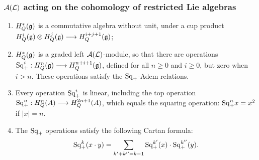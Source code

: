 \documentclass[10pt]{article}
\newcommand{\SqShift}{\Sq_{\smash{+}}}
\newcommand{\Sq}{\mathrm{Sq}}
\newcommand{\LieSteen}{\calA(\calL)}
\begin{document}
\begin{SteenrodAlgebrasAndTheirKoszulDuals}
\subsubsection{$\LieSteen$ acting on the cohomology of restricted Lie algebras}
\begin{enumerate}\squishlist
\setlength{\parindent}{.25in}
\item $H^*_Q(\mathfrak{g})$ is a commutative algebra without unit, under a cup product $H^i_Q(\mathfrak{g})\otimes H^j_Q(\mathfrak{g})\longrightarrow H^{i+j+1}_Q(\mathfrak{g})$;
\item $H^*_Q(\mathfrak{g})$ is a graded left $\LieSteen$-module, so that there are operations $\SqShift^i:H^n_Q(\frakg)\to H^{n+i+1}_Q(\frakg)$, defined for all $n\geq0$ and $i\geq0$, but zero when $i>n$. These operations satisfy the $\SqShift$-Adem relations.
\item Every operation $\SqShift^i$ is linear, including the top operation $\SqShift^n:H^n_Q(A)\to H^{2n+1}_Q(A)$, which equals the squaring operation:  $\SqShift^nx=x^2$ if $|x|=n$.
\item The $\SqShift$ operations satisfy the following Cartan formula:
\[\SqShift^k(x\cdot y)=\sum_{k'+k''=k-1}\SqShift^{k'}(x)\cdot \SqShift^{k''}(y).\]
\end{enumerate}


\end{SteenrodAlgebrasAndTheirKoszulDuals}
\end{document}
